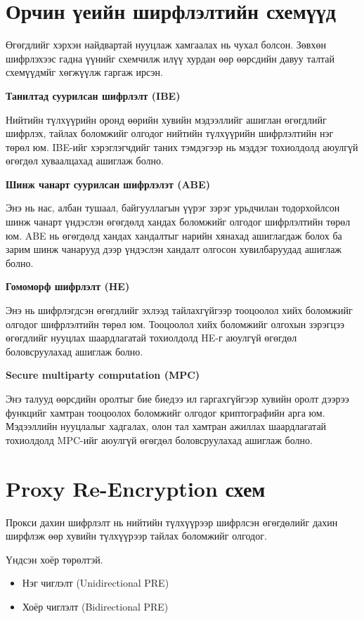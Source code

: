 \section{Орчин үеийн ширфлэлтийн схемүүд}
Өгөгдлийг хэрхэн найдвартай нууцлаж хамгаалах нь чухал болсон. Зөвхөн шифрлэхээс гадна үүнийг схемчилж илүү хурдан өөр өөрсдийн давуу талтай схемүүдмйг хөгжүүлж гаргаж ирсэн.

\textbf{Танилтад суурилсан шифрлэлт (IBE)} 

Нийтийн түлхүүрийн оронд өөрийн хувийн мэдээллийг ашиглан өгөгдлийг шифрлэх, тайлах боломжийг олгодог нийтийн түлхүүрийн шифрлэлтийн нэг төрөл юм. IBE-ийг хэрэглэгчдийг таних тэмдэгээр нь мэддэг тохиолдолд аюулгүй өгөгдөл хуваалцахад ашиглаж болно.

\textbf{Шинж чанарт суурилсан шифрлэлэт (ABE)}

Энэ нь нас, албан тушаал, байгууллагын үүрэг зэрэг урьдчилан тодорхойлсон шинж чанарт үндэслэн өгөгдөлд хандах боломжийг олгодог шифрлэлтийн төрөл юм. ABE нь өгөгдөлд хандах хандалтыг нарийн хянахад ашиглагдаж болох ба зарим шинж чанарууд дээр үндэслэн хандалт олгосон хувилбаруудад ашиглаж болно.

\textbf{Гомоморф шифрлэлт (HE)}

Энэ нь шифрлэгдсэн өгөгдлийг эхлээд тайлахгүйгээр тооцоолол хийх боломжийг олгодог шифрлэлтийн төрөл юм. Тооцоолол хийх боломжийг олгохын зэрэгцээ өгөгдлийг нууцлах шаардлагатай тохиолдолд HE-г аюулгүй өгөгдөл боловсруулахад ашиглаж болно.

\textbf{Secure multiparty computation (MPC)}

Энэ талууд өөрсдийн оролтыг бие биедээ ил гаргахгүйгээр хувийн оролт дээрээ функцийг хамтран тооцоолох боломжийг олгодог криптографийн арга юм. Мэдээллийн нууцлалыг хадгалах, олон тал хамтран ажиллах шаардлагатай тохиолдолд MPC-ийг аюулгүй өгөгдөл боловсруулахад ашиглаж болно.


\section{Proxy Re-Encryption схем}

Прокси дахин шифрлэлт нь нийтийн түлхүүрээр шифрлсэн өгөгдөлийг дахин ширфлэж өөр хувийн түлхүүрээр тайлах боломжийг олгодог.

Үндсэн хоёр төрөлтэй.
\begin{itemize}
    \item Нэг чиглэлт (Unidirectional PRE)
    \item Хоёр чиглэлт (Bidirectional PRE)
\end{itemize}

